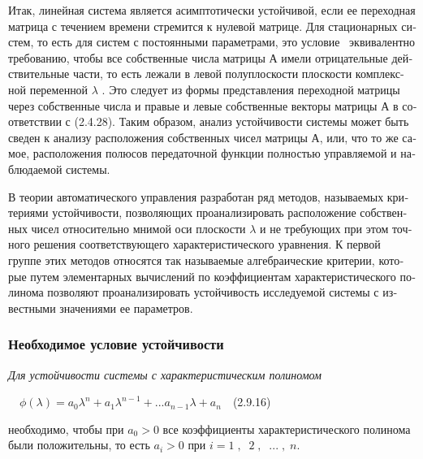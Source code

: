\documentclass[a4paper]{article}
\begin{document}
{\begin{russian}\sffamily
Итак, линейная система является асимптотически устойчивой, если ее переходная матрица с течением времени стремится к
нулевой матрице. Для стационарных систем, то есть для систем с постоянными параметрами, это условие \ эквивалентно
требованию, чтобы все собственные числа матрицы  $А$ имели отрицательные действительные части, то есть лежали в левой
полуплоскости плоскости комплексной переменной  $λ$ . Это следует из формы представления переходной матрицы через
собственные числа и правые и левые собственные векторы матрицы  $А$ в соответствии с (2.4.28). Таким образом, анализ
устойчивости системы может быть сведен к анализу расположения собственных чисел матрицы  $А$, или, что то же самое,
расположения полюсов передаточной функции полностью управляемой и наблюдаемой системы.
\end{russian}}

{\begin{russian}\sffamily
В теории автоматического управления разработан ряд методов, называемых критериями устойчивости, позволяющих
проанализировать расположение собственных чисел относительно мнимой оси плоскости  $λ$ и не требующих при этом точного
решения соответствующего характеристического уравнения. К первой группе этих методов относятся так называемые
алгебраические критерии, которые путем элементарных вычислений по коэффициентам характеристического полинома позволяют
проанализировать устойчивость исследуемой системы с известными значениями ее параметров.
\end{russian}}

\subsubsection{Необходимое условие устойчивости}
\hypertarget{RefHeadingToc455659720}{}{\begin{russian}\sffamily
\textit{Для устойчивости системы с характеристическим полиномом}
\end{russian}}

{\begin{russian}\sffamily
\ \  $ϕ(λ)=a_0λ^n+a_1λ^{n-1}+...a_{n-1}λ+a_n$\ \ (2.9.16)
\end{russian}}

{\begin{russian}\sffamily
необходимо, чтобы при  $a_0>0$ все коэффициенты характеристического полинома были положительны, то есть  $a_i>0$ при 
$i=1\;,\;\;2\;,\;\;...\;,\;n$.
\end{russian}}
\end{document}
